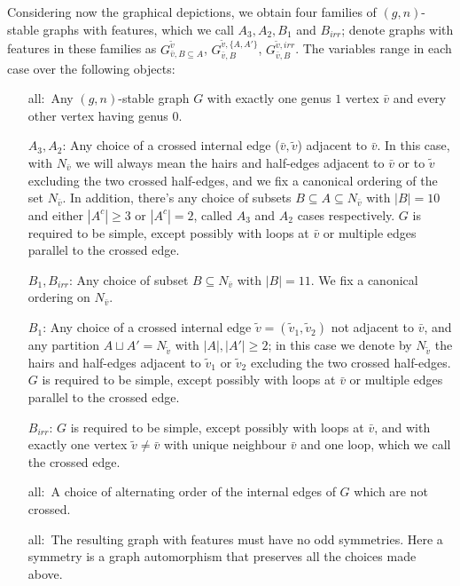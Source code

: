 Considering now the graphical depictions, we obtain four families of $(g,n)$-stable graphs with features, which we call $A_3,A_2,B_1$ and $B_{irr}$; denote graphs with features in these families as $G_{\bar{v},B\subseteq A}^{\tilde{v}}$, $G_{\bar{v},B}^{\tilde{v},\{A,A'\}}$, $G_{\bar{v},B}^{\tilde{v},irr}$. The variables range in each case over the following objects:
\begin{enumerate}
    \item[all:\, ] Any $(g,n)$-stable graph $G$ with exactly one genus $1$ vertex $\bar{v}$ and every other vertex having genus $0$.
    \item[$A_3,A_2$: ] Any choice of a crossed internal edge ($\bar{v},\tilde{v}$) adjacent to $\bar{v}$. In this case, with $N_{\bar{v}}$ we will always mean the hairs and half-edges adjacent to $\bar{v}$ or to $\tilde{v}$ excluding the two crossed half-edges, and we fix a canonical ordering of the set $N_{\bar{v}}$. In addition, there's any choice of subsets $B\subseteq A\subseteq N_{\bar{v}}$ with $|B|=10$ and either $|A^c|\geq 3$ or $|A^c|=2$, called $A_3$ and $A_2$ cases respectively. $G$ is required to be simple, except possibly with loops at $\bar{v}$ or multiple edges parallel to the crossed edge.
    \item[$B_1,B_{irr}$: ] Any choice of subset $B\subseteq N_{\bar{v}}$ with $|B|=11$.  We fix a canonical ordering on $N_{\bar{v}}$.
    \item[$B_1$:] Any choice of a crossed internal edge $\tilde{v}=(\tilde{v}_1,\tilde{v}_2)$ not adjacent to $\bar{v}$, and any partition $A\sqcup A'=N_{\tilde{v}}$ with $|A|,|A'|\geq 2$; in this case we denote by $N_{\tilde{v}}$ the hairs and half-edges adjacent to $\tilde{v}_1$ or $\tilde{v}_2$ excluding the two crossed half-edges. $G$ is required to be simple, except possibly with loops at $\bar{v}$ or multiple edges parallel to the crossed edge.
    \item[$B_{irr}$:] $G$ is required to be simple, except possibly with loops at $\bar{v}$, and with exactly one vertex $\tilde{v}\neq\bar{v}$ with unique neighbour $\bar{v}$ and one loop, which we call the crossed edge.
    \item[all:\,] A choice of alternating order of the internal edges of $G$ which are not crossed.
    \item[all:\,] The resulting graph with features must have no odd symmetries. Here a symmetry is a graph automorphism that preserves all the choices made above.
\end{enumerate}

